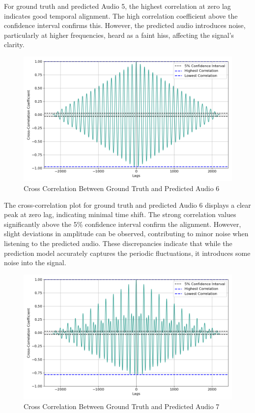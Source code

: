 \documentclass{ioereport}
\begin{document}
    For ground truth and predicted Audio 5, the highest correlation at zero lag indicates good temporal alignment. The high correlation coefficient above the confidence interval confirms this. However, the predicted audio introduces noise, particularly at higher frequencies, heard as a faint hiss, affecting the signal's clarity.

    \begin{figure}[H]
        \centering
        \includegraphics[width=\linewidth]{assets/crosscorrelation/cross_correlation_fluctuating_tone400.wav_fluctuating_tone400pred.wav.png}
        \caption{Cross Correlation Between Ground Truth and Predicted Audio 6}
        \label{fig:cross-correlation-6}
    \end{figure}

    The cross-correlation plot for ground truth and predicted Audio 6 displays a clear peak at zero lag, indicating minimal time shift. The strong correlation values significantly above the 5\% confidence interval confirm the alignment. However, slight deviations in amplitude can be observed, contributing to minor noise when listening to the predicted audio. These discrepancies indicate that while the prediction model accurately captures the periodic fluctuations, it introduces some noise into the signal.

    \begin{figure}[H]
        \centering
        \includegraphics[width=\linewidth]{assets/crosscorrelation/cross_correlation_multitoneA4E4.wav_multitoneA4E4pred.wav.png}
        \caption{Cross Correlation Between Ground Truth and Predicted Audio 7}
        \label{fig:cross-correlation-7}
    \end{figure}
\end{document}
